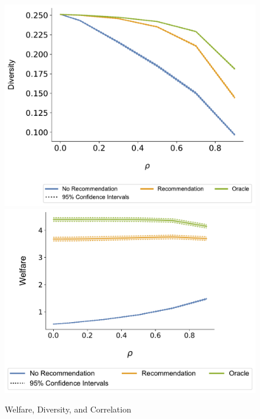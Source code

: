 \documentclass[sigconf]{acmart}
\begin{document}
\begin{figure}
\includegraphics[scale=0.1]{figures/rho_diversity_N_200_T_20}
\includegraphics[scale=0.1]{figures/rho_welfare_N_200_T_20}
\caption{Welfare, Diversity, and Correlation}
\label{fig:diversity_correlation}
\end{figure}
\end{document}
